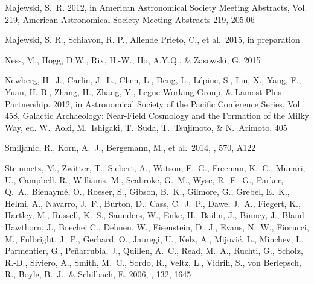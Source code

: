 \documentclass[12pt, preprint]{aastex}
\begin{document}
\begin{thebibliography}{24}
{Majewski}, S.~R. 2012, in American Astronomical Society Meeting Abstracts,
  Vol. 219, American Astronomical Society Meeting Abstracts 219, 205.06

 Majewski, S. R., Schiavon, R. P., Allende Prieto, C., et al.\ 2015, in preparation

{Ness}, M., {Hogg}, D.W., {Rix}, H.-W., {Ho}, A.Y.Q., \& {Zasowski}, G. 2015

{Newberg}, H.~J., {Carlin}, J.~L., {Chen}, L., {Deng}, L., {L{\'e}pine}, S.,
  {Liu}, X., {Yang}, F., {Yuan}, H.-B., {Zhang}, H., {Zhang}, Y., {Legue
  Working Group}, \& {Lamost-Plus Partnership}. 2012, in Astronomical Society
  of the Pacific Conference Series, Vol. 458, Galactic Archaeology: Near-Field
  Cosmology and the Formation of the Milky Way, ed. W.~{Aoki}, M.~{Ishigaki},
  T.~{Suda}, T.~{Tsujimoto}, \& N.~{Arimoto}, 405

 Smiljanic, R., Korn, A.~J., Bergemann, M., et al.\ 2014, \aap, 570, A122 

{Steinmetz}, M., {Zwitter}, T., {Siebert}, A., {Watson}, F.~G., {Freeman},
  K.~C., {Munari}, U., {Campbell}, R., {Williams}, M., {Seabroke}, G.~M.,
  {Wyse}, R.~F.~G., {Parker}, Q.~A., {Bienaym{\'e}}, O., {Roeser}, S.,
  {Gibson}, B.~K., {Gilmore}, G., {Grebel}, E.~K., {Helmi}, A., {Navarro},
  J.~F., {Burton}, D., {Cass}, C.~J.~P., {Dawe}, J.~A., {Fiegert}, K.,
  {Hartley}, M., {Russell}, K.~S., {Saunders}, W., {Enke}, H., {Bailin}, J.,
  {Binney}, J., {Bland-Hawthorn}, J., {Boeche}, C., {Dehnen}, W., {Eisenstein},
  D.~J., {Evans}, N.~W., {Fiorucci}, M., {Fulbright}, J.~P., {Gerhard}, O.,
  {Jauregi}, U., {Kelz}, A., {Mijovi{\'c}}, L., {Minchev}, I., {Parmentier},
  G., {Pe{\~n}arrubia}, J., {Quillen}, A.~C., {Read}, M.~A., {Ruchti}, G.,
  {Scholz}, R.-D., {Siviero}, A., {Smith}, M.~C., {Sordo}, R., {Veltz}, L.,
  {Vidrih}, S., {von Berlepsch}, R., {Boyle}, B.~J., \& {Schilbach}, E. 2006,
  \aj, 132, 1645


\end{thebibliography}
\end{document}

